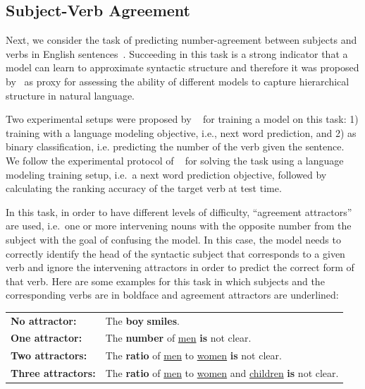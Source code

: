 \subsection{Subject-Verb Agreement}
Next, we consider the task of predicting number-agreement between subjects and verbs in English sentences~\citep{linzen2016assessing}. Succeeding in this task is a strong indicator that a model can learn to approximate syntactic structure and therefore it was proposed by~\citet{linzen2016assessing} as proxy for assessing the ability of different models to capture hierarchical structure in natural language. 

Two experimental setups were proposed by ~\citet{linzen2016assessing} for training a model on this task: 1) training with a language modeling objective, i.e., next word prediction, and 2) as binary classification, i.e. predicting the number of the verb given the sentence. 
We follow the experimental protocol of ~\citet{linzen2016assessing} for solving the task using a language modeling training setup, i.e.\ a next word prediction objective, followed by calculating the ranking accuracy of the target verb at test time. 

In this task, in order to have different levels of difficulty, ``agreement attractors'' are used, i.e.\ one or more intervening nouns with the opposite number from the subject with the goal of confusing the model. In this case, the model needs to correctly identify the head of the syntactic subject that corresponds to a given verb and ignore the intervening attractors in order to predict the correct form of that verb.
Here are some examples for this task in which subjects and the corresponding verbs are in boldface and agreement attractors are underlined:
\begin{table}[h!]
\fontsize{9}{10}\selectfont
\begin{tabular}{l l}
\textbf{No attractor:} & The \textbf{boy} \textbf{smiles}. \\
\textbf{One attractor:}  &  The \textbf{number} of \underline{men} \textbf{is} not clear. \\
\textbf{Two attractors:}  &  The \textbf{ratio} of \underline{men} to \underline{women} \textbf{is} not clear. \\
\textbf{Three attractors:} &  The \textbf{ratio} of \underline{men} to \underline{women} and \underline{children} \textbf{is} not clear. 
\end{tabular}
\end{table}

